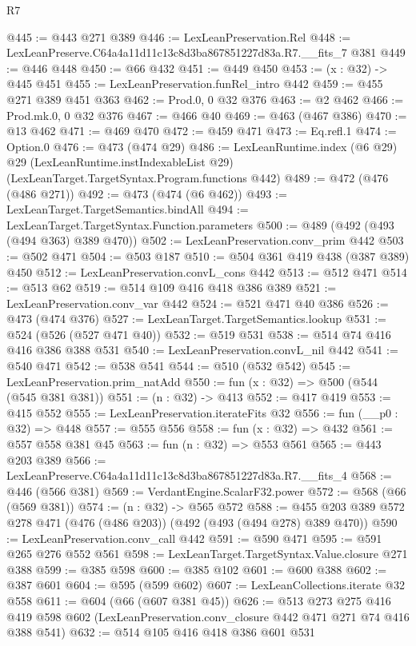 \begin{lexlean}{R7}
\begin{coremodule}
@445 := @443 @271 @389
@446 := LexLeanPreservation.Rel
@448 := LexLeanPreserve.C64a4a11d11c13c8d3ba867851227d83a.R7.__fits_7 @381
@449 := @446 @448
@450 := @66 @432
@451 := @449 @450
@453 := (x : @32) -> @445 @451
@455 := LexLeanPreservation.funRel_intro @442
@459 := @455 @271 @389 @451 @363
@462 := Prod.{0, 0} @32 @376
@463 := @2 @462
@466 := Prod.mk.{0, 0} @32 @376
@467 := @466 @40
@469 := @463 (@467 @386)
@470 := @13 @462
@471 := @469 @470
@472 := @459 @471
@473 := Eq.refl.{1}
@474 := Option.{0}
@476 := @473 (@474 @29)
@486 := LexLeanRuntime.index
    (@6 @29)
    @29
    (LexLeanRuntime.instIndexableList @29)
    (LexLeanTarget.TargetSyntax.Program.functions @442)
@489 := @472 (@476 (@486 @271))
@492 := @473 (@474 (@6 @462))
@493 := LexLeanTarget.TargetSemantics.bindAll
@494 := LexLeanTarget.TargetSyntax.Function.parameters
@500 := @489 (@492 (@493 (@494 @363) @389 @470))
@502 := LexLeanPreservation.conv_prim @442
@503 := @502 @471
@504 := @503 @187
@510 := @504 @361 @419 @438 (@387 @389) @450
@512 := LexLeanPreservation.convL_cons @442
@513 := @512 @471
@514 := @513 @62
@519 := @514 @109 @416 @418 @386 @389
@521 := LexLeanPreservation.conv_var @442
@524 := @521 @471 @40 @386
@526 := @473 (@474 @376)
@527 := LexLeanTarget.TargetSemantics.lookup
@531 := @524 (@526 (@527 @471 @40))
@532 := @519 @531
@538 := @514 @74 @416 @416 @386 @388 @531
@540 := LexLeanPreservation.convL_nil @442
@541 := @540 @471
@542 := @538 @541
@544 := @510 (@532 @542)
@545 := LexLeanPreservation.prim_natAdd
@550 := fun (x : @32) => @500 (@544 (@545 @381 @381))
@551 := (n : @32) -> @413
@552 := @417 @419
@553 := @415 @552
@555 := LexLeanPreservation.iterateFits @32
@556 := fun (__p0 : @32) => @448
@557 := @555 @556
@558 := fun (x : @32) => @432
@561 := @557 @558 @381 @45
@563 := fun (n : @32) => @553 @561
@565 := @443 @203 @389
@566 := LexLeanPreserve.C64a4a11d11c13c8d3ba867851227d83a.R7.__fits_4
@568 := @446 (@566 @381)
@569 := VerdantEngine.ScalarF32.power
@572 := @568 (@66 (@569 @381))
@574 := (n : @32) -> @565 @572
@588 := @455 @203 @389 @572 @278 @471 (@476 (@486 @203)) (@492 (@493 (@494 @278) @389 @470))
@590 := LexLeanPreservation.conv_call @442
@591 := @590 @471
@595 := @591 @265 @276 @552 @561
@598 := LexLeanTarget.TargetSyntax.Value.closure @271 @388
@599 := @385 @598
@600 := @385 @102
@601 := @600 @388
@602 := @387 @601
@604 := @595 (@599 @602)
@607 := LexLeanCollections.iterate @32 @558
@611 := @604 (@66 (@607 @381 @45))
@626 := @513
    @273
    @275
    @416
    @419
    @598
    @602
    (LexLeanPreservation.conv_closure @442 @471 @271 @74 @416 @388 @541)
@632 := @514 @105 @416 @418 @386 @601 @531

\end{coremodule}
\end{lexlean}
